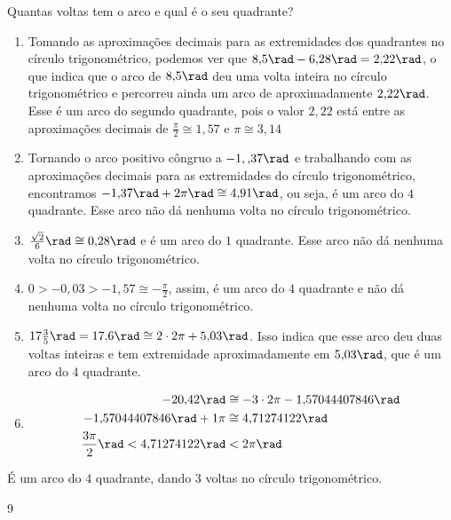 \begin{answer}{Quantas voltas tem o arco e qual é o seu quadrante?}
{
\begin{enumerate}
\item Tomando as aproximações decimais para as extremidades dos quadrantes no círculo trigonométrico, podemos ver que $8{,}5\rad - 6{,}28\rad = 2{,}22\rad$, o que indica que o arco de $8{,}5\rad$ deu uma volta inteira no círculo trigonométrico e percorreu ainda um arco de aproximadamente $2{,}22\rad$. Esse é um arco do segundo quadrante, pois o valor $2{,}22$ está entre as aproximações decimais de $\frac{\pi}{2}\cong1{,}57$ e $\pi\cong3{,}14$
\item Tornando o arco positivo côngruo a $-1,{,}37\rad$ e trabalhando com as aproximações decimais para as extremidades do círculo trigonométrico, encontramos $-1{,}37\rad+2\pi\rad \cong 4{,}91\rad$, ou seja, é um arco do $4$ quadrante. Esse arco não dá nenhuma volta no círculo trigonométrico.
\item $\frac{\sqrt{2}}{6}\rad\cong0{,}28\rad$ e é um arco do $1$ quadrante. Esse arco não dá nenhuma volta no círculo trigonométrico.
\item $0>-0{,}03>-1{,}57\cong-\frac{\pi}{2}$, assim, é um arco do $4$ quadrante e não dá nenhuma volta no círculo trigonométrico.
\item $17\frac{3}{5}\rad=17{,}6\rad\cong2\cdot2\pi+5{,}03\rad$. Isso indica que esse arco deu duas voltas inteiras e tem extremidade aproximadamente em $5{,}03\rad$, que é um arco do $4$ quadrante.
\item 
\begin{align*}
-20{,}42\rad&\cong-3\cdot2\pi-1{,}57044407846\rad \\
-1{,}57044407846\rad+1\pi&\cong4{,}71274122\rad\\
\frac{3\pi}{2}\rad<4{,}71274122\rad&<2\pi\rad
\end{align*}
\end{enumerate}
É um arco do $4$ quadrante, dando $3$ voltas no círculo trigonométrico.
}{9}
\end{answer}
